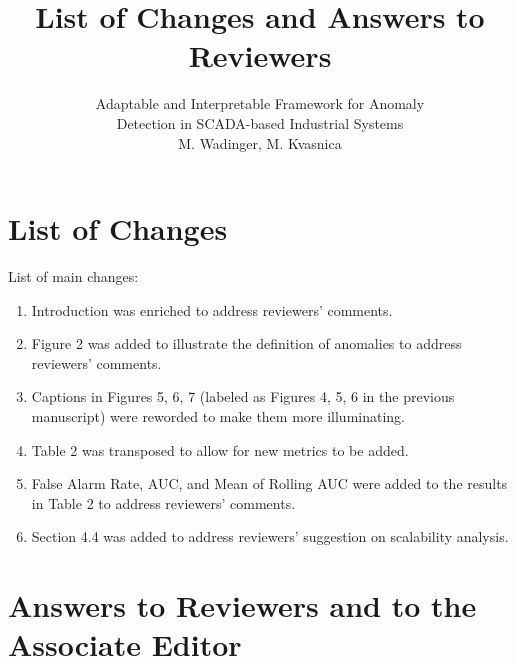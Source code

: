 \documentclass{article}
\title{List of Changes and Answers to Reviewers}
\author{Adaptable and Interpretable Framework for Anomaly\\Detection in SCADA-based Industrial Systems
  \\M. Wadinger, M. Kvasnica}
\begin{document}
\maketitle


\section{List of Changes}

List of main changes:
\begin{enumerate}

  \item Introduction was enriched to address reviewers' comments.
  \item Figure 2 was added to illustrate the definition of anomalies to address reviewers' comments.
  \item Captions in Figures 5, 6, 7 (labeled as Figures 4, 5, 6 in the previous manuscript) were reworded to make them more illuminating.
  \item Table 2 was transposed to allow for new metrics to be added.
  \item False Alarm Rate, AUC, and Mean of Rolling AUC were added to the results in Table 2 to address reviewers' comments.
  \item Section 4.4 was added to address reviewers' suggestion on scalability analysis.
\end{enumerate}

\section{Answers to Reviewers and to the Associate Editor}
\end{document}

